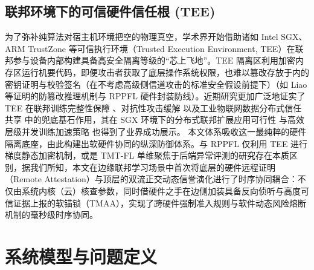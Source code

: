 \documentclass[runningheads]{llncs}
\begin{document}
\subsection{联邦环境下的可信硬件信任根 (TEE)}
为了弥补纯算法对宿主机环境把空的物理真空，学术界开始借助诸如 Intel SGX、ARM TrustZone 等可信执行环境（Trusted Execution Environment, TEE）在联邦参与设备内部构建具备高安全隔离等级的“芯上飞地”。TEE 隔离区利用加密内存区运行机要代码，即便攻击者获取了底层操作系统权限，也难以篡改存放于内的密钥证明与校验签名（在不考虑高级侧信道攻击的标准安全假设前提下）（如 Liao 等证明的防篡改推理机制\cite{liao2024verifiable}与 RPPFL 硬件封装防线\cite{zhang2025rppfl}）。近期研究更加广泛地证实了 TEE 在联邦训练完整性保障 \cite{r1_tee_integrity}、对抗性攻击缓解 \cite{r5_tee_mitigating} 以及工业物联网数据分布式信任共享 \cite{r12_iot_tee} 中的兜底基石作用，其在 SGX 环境下的分布式联邦扩展应用可行性 \cite{xu2021distributed} 与高效层级并发训练加速策略 \cite{yan2024efficient} 也得到了业界成功展示。
本文体系吸收这一最纯粹的硬件隔离底座，由此构建出软硬件协同的纵深防御体系。与 RPPFL \cite{zhang2025rppfl} 仅利用 TEE 进行梯度静态加密机制，或是 TMT-FL \cite{lu2025tmt} 单维聚焦于后端异常评测的研究存在本质区别，据我们所知，本文在边缘联邦学习场景中首次将底层的硬件远程证明（Remote Attestation）与顶层的双流正交动态信誉演化进行了时序协同耦合：不仅由系统内核（云）核查参数，同时借硬件之手在边侧加装具备反向侦听与高度可信证据上报的软锚锁（TMAA），实现了跨硬件强制准入规则与软件动态风险熔断机制的毫秒级时序协同。


\section{系统模型与问题定义}
\end{document}
